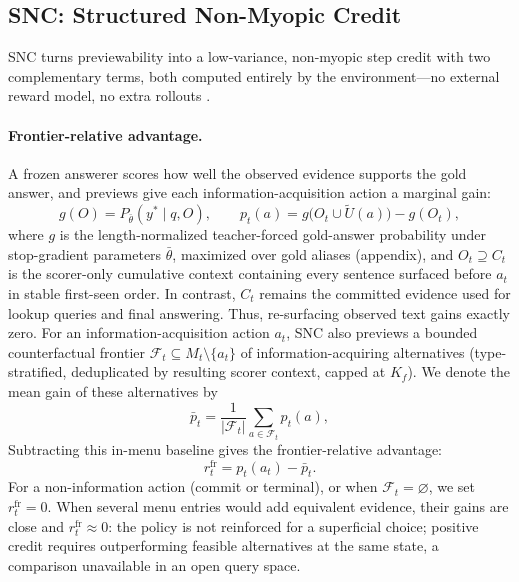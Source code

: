 \documentclass[letterpaper]{article} %
\begin{document}
\subsection{SNC: Structured Non-Myopic Credit}

SNC turns previewability into a low-variance, non-myopic step credit with two complementary terms, both computed entirely by the environment---no external reward model, no extra rollouts \citep[cf.][]{treegrpo2025,feng2025gigpo}.

\paragraph{Frontier-relative advantage.}
A frozen answerer scores how well the observed evidence supports the gold answer, and previews give each information-acquisition action a marginal gain:
\begin{equation}
g(O)=P_{\bar\theta}(y^*\mid q,O),
\qquad
p_t(a)=g\big(O_t\cup \widetilde{U}(a)\big)-g(O_t),
\label{eq:gain}
\end{equation}
where $g$ is the length-normalized teacher-forced gold-answer probability under stop-gradient parameters $\bar\theta$, maximized over gold aliases (appendix), and $O_t\supseteq C_t$ is the scorer-only cumulative context containing every sentence surfaced before $a_t$ in stable first-seen order. In contrast, $C_t$ remains the committed evidence used for lookup queries and final answering. Thus, re-surfacing observed text gains exactly zero. For an information-acquisition action $a_t$, SNC also previews a bounded counterfactual frontier $\mathcal{F}_t\subseteq M_t\setminus\{a_t\}$ of information-acquiring alternatives (type-stratified, deduplicated by resulting scorer context, capped at $K_f$). We denote the mean gain of these alternatives by
\begin{equation}
\bar p_t=\frac{1}{|\mathcal{F}_t|}\sum_{a\in\mathcal{F}_t}p_t(a),
\label{eq:frontier-baseline}
\end{equation}
Subtracting this in-menu baseline gives the frontier-relative advantage:
\begin{equation}
r_t^{\mathrm{fr}}=p_t(a_t)-\bar p_t.
\label{eq:frontier}
\end{equation}
For a non-information action (commit or terminal), or when $\mathcal{F}_t=\varnothing$, we set $r_t^{\mathrm{fr}}=0$.
When several menu entries would add equivalent evidence, their gains are close and $r_t^{\mathrm{fr}}\approx 0$: the policy is not reinforced for a superficial choice; positive credit requires outperforming feasible alternatives at the same state, a comparison unavailable in an open query space.
\end{document}
